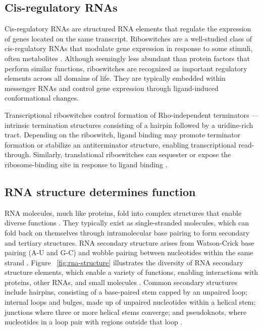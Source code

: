 \subsection{Cis-regulatory RNAs}


Cis-regulatory RNAs are structured RNA elements that regulate the expression of genes located on the same transcript.
Riboswitches are a well-studied class of cis-regulatory RNAs that modulate gene expression in response to some stimuli, often metabolites \citep{Breaker2023}.
Although seemingly less abundant than protein factors that perform similar functions, riboswitches are recognized as important regulatory elements across all domains of life.
They are typically embedded within messenger RNAs and control gene expression through ligand-induced conformational changes.

Transcriptional riboswitches control formation of Rho-independent terminators — intrinsic termination structures consisting of a hairpin followed by a uridine-rich tract. 
Depending on the riboswitch, ligand binding may promote terminator formation or stabilize an antiterminator structure, enabling transcriptional read-through.
Similarly, translational riboswitches can sequester or expose the ribosome-binding site in response to ligand binding \citep{Breaker2023}.

\subsection{RNA structure determines function}

RNA molecules, much like proteins, fold into complex structures that enable diverse functions \citep{Wang2021}.
They typically exist as single-stranded molecules, which can fold back on themselves through intramolecular base pairing to form secondary and tertiary structures.
RNA secondary structure arises from Watson-Crick base pairing (A-U and G-C) and wobble pairing between nucleotides within the same strand \citep{Tinoco1999}. 
Figure ~\ref{fig:rna-structure} illustrates the diversity of RNA secondary structure elements, which enable a variety of functions, enabling interactions with proteins, other RNAs, and small molecules \citep{Marklund2023}.
Common secondary structures include hairpins, consisting of a base-paired stem capped by an unpaired loop; internal loops and bulges, made up of unpaired nucleotides within a helical stem; junctions where three or more helical stems converge; and pseudoknots, where nucleotides in a loop pair with regions outside that loop \citep{Staple2005}.

